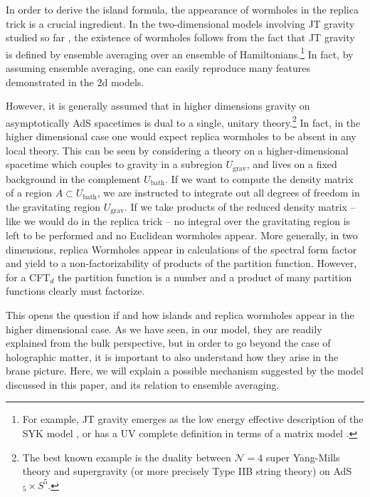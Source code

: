 
In order to derive the island formula, the appearance of wormholes in the replica trick is a crucial ingredient.
In the two-dimensional models involving JT gravity studied so far \cite{Almheiri:2019qdq,Penington:2019kki}, the existence of wormholes follows from the fact that JT gravity is defined by ensemble averaging over an ensemble of Hamiltonians.\footnote{For example, JT gravity emerges as the low energy effective description of the SYK model \cite{}, or has a UV complete definition in terms of a matrix model \cite{Saad:2019lba}.} In fact, by assuming ensemble averaging, one can easily reproduce many features \cite{Marolf:2020xie} demonstrated in the 2d models. 

However, it is generally assumed that in higher dimensions gravity on asymptotically AdS spacetimes is dual to a single, unitary theory.\footnote{The best known example is the duality between $\mathcal N=4$ super Yang-Mills theory and supergravity (or more precisely Type IIB string theory) on AdS${}_5\times S^5$.} In fact, in the higher dimensional case one would expect replica wormholes to be absent in any local theory. This can be seen by considering a theory on a higher-dimensional spacetime which couples to gravity in a subregion $U_\text{grav}$, and lives on a fixed background in the complement $U_\text{bath}$. If we want to compute the density matrix of a region $A \subset U_\text{bath}$, we are instructed to integrate out all degrees of freedom in the gravitating region $U_\text{grav}$. If we take products of the reduced density matrix -- like we would do in the replica trick -- no integral over the gravitating region is left to be performed and no Euclidean wormholes appear. More generally, in two dimensions, replica Wormholes appear in calculations of the spectral form factor and yield to a non-factorizability of products of the partition function. However, for a CFT${}_d$ the partition function is a number and a product of many partition functions clearly must factorize.

This opens the question if and how islands and replica wormholes appear in the higher dimensional case. As we have seen, in our model, they are readily explained from the bulk perspective, but in order to go beyond the case of holographic matter, it is important to also understand how they arise in the brane picture. Here, we will explain a possible mechanism suggested by the model discussed in this paper, and its relation to ensemble averaging.

